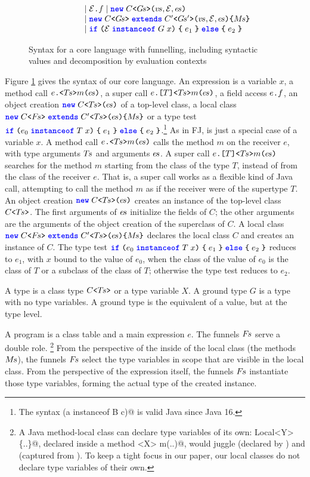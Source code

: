 \begin{figure}
\[\begin{array}{rrcl}
    &&& \mid \mathcal{E}\fstop f \mid \obj{C}{\pl{G}}{\pl{v},\mathcal{E},\pl{e}}\\
    &&& \mid \innerobj{C}{\pl{G}}{C'}{\pl{G}'}{\pl{v},\mathcal{E},\pl{e}}{\pl{M}}\\
    &&& \mid \ifthen{\mathcal{E}}{G}{x}{e_1}{e_2}
\end{array}
\]
\vspace{-1em}
\caption{Syntax for a core language with funnelling, including syntactic values and decomposition by evaluation contexts}
\label{fig:syntax}
\end{figure}

Figure \ref{fig:syntax} gives the syntax of our core language.
An expression is a variable $x$, a method call $\call{e}{\pl{T}}{m}{\pl{e}}$, a super call $\explicitcall{e}{T}{\pl{T}}{m}{\pl{e}}$, a field access $e\fstop f$, an object creation $\obj{C}{\pl{T}}{\pl{e}}$ of a top-level class, a local class $\innerobj{C}{\pl{F}}{C'}{\pl{T}}{\pl{e}}{\pl{M}}$ or a type test $\ifthen{e_0}{T}{x}{e_1}{e_2}$.\footnote{The syntax \Q@if (a instanceof B c)@ is valid Java since Java 16.}
As in FJ, \Q@this@ is just a special case of a variable $x$.
A method call $\call{e}{\pl{T}}{m}{\pl{e}}$ calls the method $m$ on the receiver $e$, with type arguments $\pl{T}$ and arguments $\pl{e}$.
A super call $\explicitcall{e}{T}{\pl{T}}{m}{\pl{e}}$ searches for the method $m$ starting from the class of the type $T$, instead of from the class of the receiver $e$.
That is, a super call works as a flexible kind of Java \Q@super@ call, attempting to call the method $m$ as if the receiver were of the supertype $T$.
An object creation $\obj{C}{\pl{T}}{\pl{e}}$ creates an instance of the top-level class $\gen{C}{\pl{T}}$.
The first arguments of $\pl{e}$ initialize the fields of $C$; the other arguments are the arguments of the object creation of the superclass of $C$.
A local class $\innerobj{C}{\pl{F}}{C'}{\pl{T}}{\pl{e}}{\pl{M}}$ declares the local class $C$ and creates an instance of $C$.
The type test $\ifthen{e_0}{T}{x}{e_1}{e_2}$ reduces to $e_1$, with $x$ bound to the value of $e_0$, when the class of the value of $e_0$ is the class of $T$ or a subclass of the class of $T$; otherwise the type test reduces to $e_2$.

A type is a class type $\gen{C}{\pl{T}}$ or a type variable $X$.
A ground type $G$ is a type with no type variables.
A ground type is the equivalent of a value, but at the type level.

A program is a class table \decls and a main expression $e$.
The funnels $\pl{F}$ serve a double role.%
\footnote{A Java method-local class can declare type variables of its own: \Q@class Local<Y>\{..\}@, declared inside a method \Q@<X> m(..)@, would juggle \Q@Y@ (declared by \Q@Local@) and \Q@X@ (captured from \Q@m@).
To keep a tight focus in our paper, our local classes do not declare type variables of their own.}
From the perspective of the inside of the local class (the methods $\pl{M}$), the funnels $\pl{F}$ select the type variables in scope that are visible in the local class.
From the perspective of the \Q@new@ expression itself, the funnels $\pl{F}$ instantiate those type variables, forming the actual type of the created instance.

